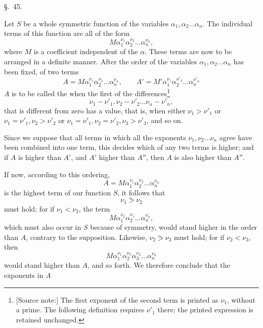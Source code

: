 \begin{center}
{\large \S.\ 45.}

\vspace{0.5em}
{\large{}}
\end{center}

Let $S$ be a whole symmetric function of the variables $\alpha_1,\alpha_2\ldots\alpha_n$. The individual terms of this function are all of the form
\[
 M\alpha_1^{\nu_1}\alpha_2^{\nu_2}\ldots\alpha_n^{\nu_n},
\]
where $M$ is a coefficient independent of the $\alpha$. These terms are now to be arranged in a definite manner. After the order of the variables $\alpha_1,\alpha_2\ldots\alpha_n$ has been fixed, of two terms
\[
 A=M\alpha_1^{\nu_1}\alpha_2^{\nu_2}\ldots\alpha_n^{\nu_n},\qquad
 A'=M'\alpha_1^{\nu_1}\alpha_2^{\nu'_2}\ldots\alpha_n^{\nu'_n}
\]
$A$ is to be called the  when the first of the differences\begingroup\renewcommand{\thefootnote}{E1}\footnote[1]{[Source note:] The first exponent of the second term is printed as $\nu_1$, without a prime. The following definition requires $\nu'_1$ there; the printed expression is retained unchanged.}\endgroup
\[
 \nu_1-\nu'_1,\nu_2-\nu'_2\ldots\nu_n-\nu'_n,
\]
that is different from zero has a  value, that is, when either $\nu_1>\nu'_1$ or $\nu_1=\nu'_1,\nu_2>\nu'_2$ or $\nu_1=\nu'_1,\nu_2=\nu'_2,\nu_3>\nu'_3$, and so on.

Since we suppose that all terms in which all the exponents $\nu_1,\nu_2\ldots\nu_n$ agree have been combined into one term, this decides which of any two terms is higher; and if $A$ is higher than $A'$, and $A'$ higher than $A''$, then $A$ is also higher than $A''$.

If now, according to this ordering,
\[
 A=M\alpha_1^{\nu_1}\alpha_2^{\nu_2}\ldots\alpha_n^{\nu_n}
\]
is the highest term of our function $S$, it follows that
\[
 \nu_1\eqslantgtr\nu_2
\]
must hold; for if $\nu_1<\nu_2$, the term
\[
 M\alpha_1^{\nu_2}\alpha_2^{\nu_1}\ldots\alpha_n^{\nu_n},
\]
which must also occur in $S$ because of symmetry, would stand higher in the order than $A$, contrary to the supposition. Likewise, $\nu_2\eqslantgtr\nu_3$ must hold; for if $\nu_2<\nu_3$, then
\[
 M\alpha_1^{\nu_1}\alpha_2^{\nu_3}\alpha_3^{\nu_2}\ldots\alpha_n^{\nu_n}
\]
would stand higher than $A$, and so forth. We therefore conclude that the exponents in $A$
